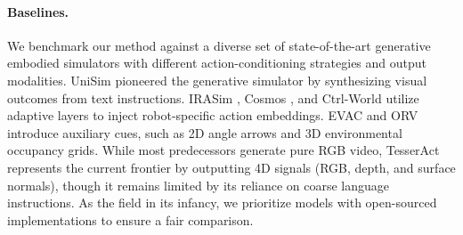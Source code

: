 \begin{table}[t]
\centering
\setlength{\tabcolsep}{6pt}
\caption{\textbf{Quantitative comparison of geometric metrics}. “(temp)” denotes the self-temporal consistency across frames. The threshold of F-Score is set to @0.01.}
\vspace{-0.3cm}
\label{tab:3d_metrics}
\vspace{-0.4cm}
\end{table}

\paragraph{Baselines.}
We benchmark our method against a diverse set of state-of-the-art generative embodied simulators with different action-conditioning strategies and output modalities. UniSim \cite{yang2024learning} pioneered the generative simulator by synthesizing visual outcomes from text instructions. IRASim \cite{zhu2025irasim}, Cosmos \cite{agarwal2025cosmos}, and Ctrl-World \cite{guo2026ctrl} utilize adaptive layers to inject robot-specific action embeddings. EVAC \cite{jiang2025enerverse} and ORV \cite{yang2026orv} introduce auxiliary cues, such as 2D angle arrows and 3D environmental occupancy grids. While most predecessors generate pure RGB video, TesserAct \cite{zhen2025tesseract} represents the current frontier by outputting 4D signals (RGB, depth, and surface normals), though it remains limited by its reliance on coarse language instructions.
As the field in its infancy, we prioritize models with open-sourced implementations to ensure a fair comparison.


